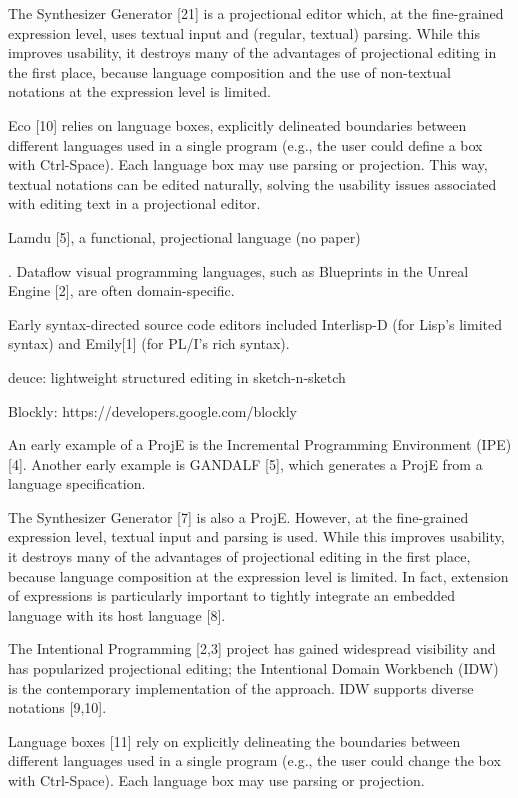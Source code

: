The Synthesizer Generator [21] is a projectional editor which, at the fine-grained expression level, uses textual input and (regular, textual) parsing.
While this improves usability, it destroys many of the advantages of projectional editing in the first place, because language composition and the use of non-textual notations at the expression level is limited.

Eco [10] relies on language boxes, explicitly delineated boundaries between different languages used in a single program (e.g., the user could define a box with Ctrl-Space).
Each language box may use parsing or projection.
This way, textual notations can be edited naturally, solving the usability issues associated with editing text in a projectional editor.

Lamdu [5], a functional, projectional language (no paper)

. Dataflow visual programming languages, such as Blueprints in the Unreal Engine [2], are often domain-specific.


Early syntax-directed source code editors included Interlisp-D (for Lisp’s limited syntax) and Emily[1] (for PL/I’s rich syntax).

deuce: lightweight structured editing in sketch-n-sketch

Blockly: https://developers.google.com/blockly



An early example of a ProjE is the Incremental Programming Environment (IPE) [4].
Another early example is GANDALF [5], which generates a ProjE from a language specification.

The Synthesizer Generator [7] is also a ProjE.
However, at the fine-grained expression level, textual input and parsing is used.
While this improves usability, it destroys many of the advantages of projectional editing in the first place, because language composition at the expression level is limited.
In fact, extension of expressions is particularly important to tightly integrate an embedded language with its host language [8].

The Intentional Programming [2,3] project has gained widespread visibility and has popularized projectional editing; the Intentional Domain Workbench (IDW) is the contemporary implementation of the approach.
IDW supports diverse notations [9,10].


Language boxes [11] rely on explicitly delineating the boundaries between different languages used in a single program (e.g., the user could change the box with Ctrl-Space).
Each language box may use parsing or projection.













